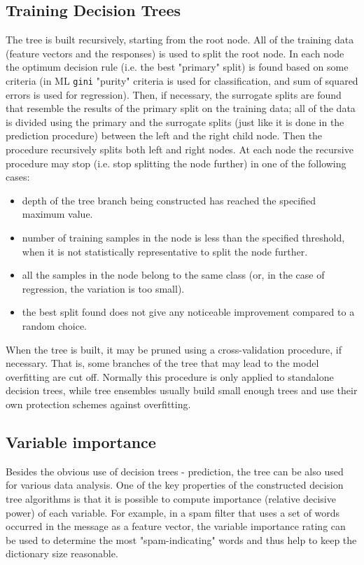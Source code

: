 \subsection{Training Decision Trees}

The tree is built recursively, starting from the root node. All of the training data (feature vectors and the responses) is used to split the root node. In each node the optimum decision rule (i.e. the best "primary" split) is found based on some criteria (in ML \texttt{gini} "purity" criteria is used for classification, and sum of squared errors is used for regression). Then, if necessary, the surrogate splits are found that resemble the results of the primary split on the training data; all of the data is divided using the primary and the surrogate splits (just like it is done in the prediction procedure) between the left and the right child node. Then the procedure recursively splits both left and right nodes. At each node the recursive procedure may stop (i.e. stop splitting the node further) in one of the following cases:
\begin{itemize}
\item{depth of the tree branch being constructed has reached the specified maximum value.}
\item{number of training samples in the node is less than the specified threshold, when it is not statistically representative to split the node further.}
\item{all the samples in the node belong to the same class (or, in the case of regression, the variation is too small).}
\item{the best split found does not give any noticeable improvement compared to a random choice.}
\end{itemize}
When the tree is built, it may be pruned using a cross-validation procedure, if necessary. That is, some branches of the tree that may lead to the model overfitting are cut off. Normally this procedure is only applied to standalone decision trees, while tree ensembles usually build small enough trees and use their own protection schemes against overfitting.

\subsection{Variable importance}

Besides the obvious use of decision trees - prediction, the tree can be also used for various data analysis. One of the key properties of the constructed decision tree algorithms is that it is possible to compute importance (relative decisive power) of each variable. For example, in a spam filter that uses a set of words occurred in the message as a feature vector, the variable importance rating can be used to determine the most "spam-indicating" words and thus help to keep the dictionary size reasonable.

